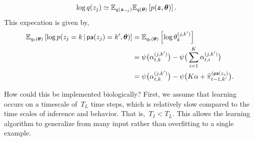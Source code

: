 \begin{align*}
  \log q(z_j) &\simeq \mathbb{E}_{q(\boldsymbol{z}_{\neg j})} \mathbb{E}_{q(\boldsymbol{\theta})} \left[ p(\boldsymbol{z}, \boldsymbol{\theta}) \right].
\end{align*}
This expecation is given by,
\begin{align}
  \nonumber
  \mathbb{E}_{q_t(\boldsymbol{\theta})} \left[\log p(z_j=k \,|\, \mathsf{pa}(z_j)=k', \boldsymbol{\theta})\right]
  &= \mathbb{E}_{q_t(\boldsymbol{\theta})} \left[\log \theta_{k}^{(j,k')} \right] \\
  \nonumber
  &= \psi\big(\alpha_{t,k}^{(j,k')}\big)
  - \psi\big(\sum_{i=1}^K \alpha_{t,i}^{(j,k')} \big) \\
  \label{eq:expected_log_theta_syn}
  &= \psi\big(\alpha_{t,k}^{(j,k')}\big)
  - \psi\big(K\alpha + \widehat{\pi}_{t-1,k'}^{(\mathsf{pa}(z_j)} \big).
\end{align}

How could this be implemented biologically?
First, we assume that learning occurs on a 
timescale of~$T_L$ time steps, which is relatively slow compared to
the time scales of inference and behavior. That is,~$T_I < T_L$.
This allows the learning algorithm to generalize from many
input rather than overfitting to a single example.

